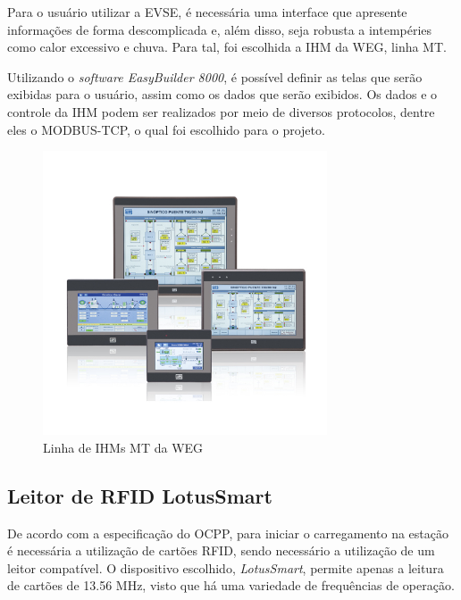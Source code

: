 Para o usuário utilizar a EVSE, é necessária uma interface que apresente informações de forma descomplicada e, além disso, seja robusta a intempéries como calor excessivo e chuva. Para tal, foi escolhida a \ac{IHM} da WEG, linha MT.

Utilizando o \textit{software EasyBuilder 8000}, é possível definir as telas que serão exibidas para o usuário, assim como os dados que serão exibidos. Os dados e o controle da IHM podem ser realizados por meio de diversos protocolos, dentre eles o MODBUS-TCP, o qual foi escolhido para o projeto.

\begin{figure}[H]
        \begin{center}
                \includegraphics[width=0.75\textwidth,natwidth=400,natheight=288]{assets/images/devices-hmi.jpg}
                \caption{Linha de IHMs MT da WEG}
                \label{fig:ihm}
        \end{center}
\end{figure}

\subsection{Leitor de RFID LotusSmart}

De acordo com a especificação do \ac{OCPP}, para iniciar o carregamento na estação é necessária a utilização de cartões \ac{RFID}, sendo necessário a utilização de um leitor compatível. O dispositivo escolhido, \textit{LotusSmart}, permite apenas a leitura de cartões de 13.56 MHz, visto que há uma variedade de frequências de operação.

